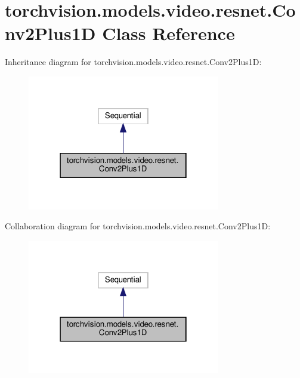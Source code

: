 \hypertarget{classtorchvision_1_1models_1_1video_1_1resnet_1_1Conv2Plus1D}{}\section{torchvision.\+models.\+video.\+resnet.\+Conv2\+Plus1D Class Reference}
\label{classtorchvision_1_1models_1_1video_1_1resnet_1_1Conv2Plus1D}


Inheritance diagram for torchvision.\+models.\+video.\+resnet.\+Conv2\+Plus1D\+:
\nopagebreak
\begin{figure}[H]
\begin{center}
\leavevmode
\includegraphics[width=238pt]{classtorchvision_1_1models_1_1video_1_1resnet_1_1Conv2Plus1D__inherit__graph}
\end{center}
\end{figure}


Collaboration diagram for torchvision.\+models.\+video.\+resnet.\+Conv2\+Plus1D\+:
\nopagebreak
\begin{figure}[H]
\begin{center}
\leavevmode
\includegraphics[width=238pt]{classtorchvision_1_1models_1_1video_1_1resnet_1_1Conv2Plus1D__coll__graph}
\end{center}
\end{figure}
